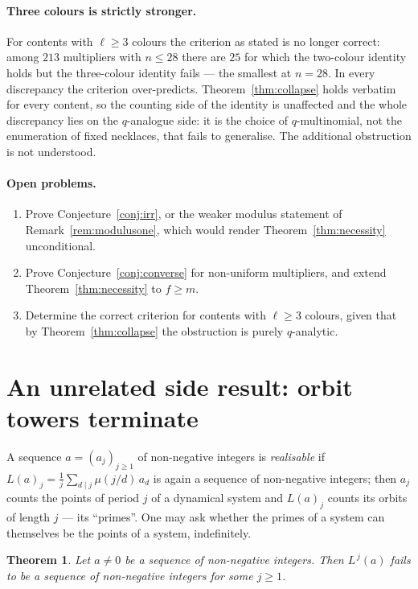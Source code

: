 \documentclass[11pt,a4paper]{article}
\theoremstyle{plain}
\newtheorem{theorem}{Theorem}[section]
\theoremstyle{definition}
\theoremstyle{remark}
\begin{document}
\paragraph{Three colours is strictly stronger.} For contents with $\ell\ge3$ colours the
criterion as stated is no longer correct: among $213$ multipliers with $n\le28$ there are
$25$ for which the two-colour identity holds but the three-colour identity fails --- the
smallest at $n=28$. In every discrepancy the criterion over-predicts. Theorem~\ref{thm:collapse}
holds verbatim for every content, so the counting side of the identity is unaffected and the
whole discrepancy lies on the $q$-analogue side: it is the choice of $q$-multinomial, not the
enumeration of fixed necklaces, that fails to generalise. The additional obstruction is not
understood.

\paragraph{Open problems.}
\begin{enumerate}
  \item Prove Conjecture~\ref{conj:irr}, or the weaker modulus statement of
        Remark~\ref{rem:modulusone}, which would render Theorem~\ref{thm:necessity}
        unconditional.
  \item Prove Conjecture~\ref{conj:converse} for non-uniform multipliers, and extend
        Theorem~\ref{thm:necessity} to $f\ge m$.
  \item Determine the correct criterion for contents with $\ell\ge3$ colours, given that by
        Theorem~\ref{thm:collapse} the obstruction is purely $q$-analytic.
\end{enumerate}

\appendix

\section{An unrelated side result: orbit towers terminate}\label{app:tower}

A sequence $a=(a_j)_{j\ge1}$ of non-negative integers is \emph{realisable} if
$L(a)_j=\frac1j\sum_{d\mid j}\mu(j/d)\,a_d$ is again a sequence of non-negative integers;
then $a_j$ counts the points of period $j$ of a dynamical system and $L(a)_j$ counts its
orbits of length $j$ --- its ``primes''. One may ask whether the primes of a system can
themselves be the points of a system, indefinitely.

\begin{theorem}\label{thm:tower}
Let $a\ne0$ be a sequence of non-negative integers. Then $L^{\,j}(a)$ fails to be a sequence
of non-negative integers for some $j\ge1$.
\end{theorem}
\end{document}
